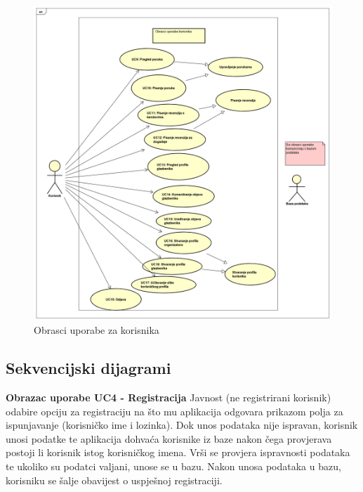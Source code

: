 		\begin{figure}[H]
			\begin{center}
				\includegraphics[width=17cm]{slike/korisnik.PNG}
			\end{center}
			\caption{Obrasci uporabe za korisnika}
			\label{fig:ou3}
		\end{figure}
				
				
			\subsection{Sekvencijski dijagrami}
				
				\textbf{Obrazac uporabe UC4 - Registracija}
				\newline
				Javnost (ne registrirani korisnik) odabire opciju za registraciju na što mu aplikacija odgovara prikazom polja za ispunjavanje (korisničko ime i lozinka). Dok unos podataka nije ispravan, korisnik unosi podatke te aplikacija dohvaća korisnike iz baze nakon čega provjerava postoji li korisnik istog korisničkog imena. Vrši se provjera ispravnosti podataka te ukoliko su podatci valjani, unose se u bazu. Nakon unosa podataka u bazu, korisniku se šalje obavijest o uspješnoj registraciji. 
				
